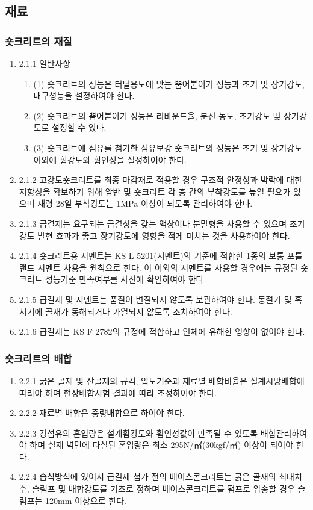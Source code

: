 \newpage
\subsection{재료}

\subsubsection{숏크리트의 재질}
\begin{enumerate}
\item  2.1.1 일반사항  
	\begin{enumerate}
	\item  (1) 숏크리트의 성능은 터널용도에 맞는 뿜어붙이기 성능과 초기 및 장기강도, 내구성능을 설정하여야 한다. 
	\item  (2) 숏크리트의 뿜어붙이기 성능은 리바운드율, 분진 농도, 초기강도 및 장기강도로 설정할 수 있다. 
	\item  (3) 숏크리트에 섬유를 첨가한 섬유보강 숏크리트의 성능은 초기 및 장기강도 이외에 휨강도와 휨인성을 설정하여야 한다. 
	\end{enumerate}
\item  2.1.2 고강도숏크리트를 최종 마감재로 적용할 경우 구조적 안정성과 박락에 대한 저항성을 확보하기 위해 암반 및 숏크리트 각 층 간의 부착강도를 높일 필요가 있으며 재령 28일 부착강도는 1MPa 이상이 되도록 관리하여야 한다.  
\item  2.1.3 급결제는 요구되는 급결성을 갖는 액상이나 분말형을 사용할 수 있으며 조기 강도 발현 효과가 좋고 장기강도에 영향을 적게 미치는 것을 사용하여야 한다.   
\item  2.1.4 숏크리트용 시멘트는 KS L 5201(시멘트)의 기준에 적합한 1종의 보통 포틀랜드 시멘트 사용을 원칙으로 한다. 이 이외의 시멘트를 사용할 경우에는 규정된 숏크리트 성능기준 만족여부를 사전에 확인하여야 한다.  
\item  2.1.5 급결제 및 시멘트는 품질이 변질되지 않도록 보관하여야 한다. 동절기 및 혹서기에 골재가 동해되거나 가열되지 않도록 조치하여야 한다.  
\item  2.1.6 급결제는 KS F 2782의 규정에 적합하고 인체에 유해한 영향이 없어야 한다.  
\end{enumerate}

\subsubsection{숏크리트의 배합}
\begin{enumerate}
\item  2.2.1 굵은 골재 및 잔골재의 규격, 입도기준과 재료별 배합비율은 설계시방배합에 따라야 하며 현장배합시험 결과에 따라 조정하여야 한다.  
\item  2.2.2 재료별 배합은 중량배합으로 하여야 한다.  
\item  2.2.3 강섬유의 혼입량은 설계휨강도와 휨인성값이 만족될 수 있도록 배합관리하여야 하며 실제 벽면에 타설된 혼입량은 최소 295N/㎥(30kgf/㎥) 이상이 되어야 한다.  
\item  2.2.4 습식방식에 있어서 급결제 첨가 전의 베이스콘크리트는 굵은 골재의 최대치수, 슬럼프 및 배합강도를 기초로 정하며 베이스콘크리트를 펌프로 압송할 경우 슬럼프는 120mm 이상으로 한다.  
\end{enumerate}

